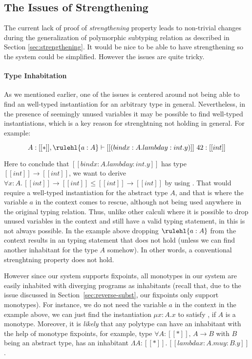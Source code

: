 \subsection{The Issues of Strengthening}
\label{sec:habitability}

The current lack of proof of \emph{strengthening} property leads to non-trivial
changes during the generalization of polymorphic subtyping relation as
described in Section \ref{sec:strengthening}. It would be nice to be able to
have strengthening so the system could be simplified. However the issues are
quite tricky.

\paragraph{Type Inhabitation}
As we mentioned earlier, one of the issues is centered around not being able to find an
well-typed instantiation for an arbitrary type in general. Nevertheless, in the presence of
seemingly unused variables it may be possible to find well-typed instantiations,
which is a key reason for strenghtning not holding in general. For example:

\begin{equation*}
    A : [[*]], \rulehl{a : A} \vdash [[(bind x : A. lambda y : int. y)]]~42 : [[int]]
\end{equation*}

Here to conclude that $[[bind x : A. lambda y : int. y]]$ has type $[[int]] \rightarrow [[int]]$,
we want to derive $\forall x : A.\, [[int]] \rightarrow [[int]] \le [[int]] \rightarrow [[int]]$ by
using . That would require a well-typed instantiation
for the abstract type $A$, and that is where the variable $a$ in the context
comes to rescue, although not being used anywhere in the original typing relation.
Thus, unlike other calculi where it is possible to drop unused variables in the context
and still have a valid typing statement, in \name this is not always possible. In the example
above dropping $\rulehl{a : A}$ from the context results in an typing statement that does not hold
(unless we can find another inhabitant for the type $A$ somehow).
In other words, a conventional strenghtning property does not hold.

However since our system supports fixpoints, all monotypes in our system
are easily inhabited with diverging programs as inhabitants (recall that, due
to the issue discussed in Section~\ref{sec:reverse-subst}, our fixpoints only support monotypes).
For instance, we do not need the variable $a$ in the context in the example above,
we can just find the instantiation $\mu x : A. x$ to satisfy , if $A$ is a
monotype.
Moreover, it is \emph{likely} that any polytype can have an inhabitant with the help
of monotype fixpoints, for example, type $\forall A : [[*]],\, A \rightarrow B$ with $B$
being an abstract type, has an inhabitant $\Lambda A : [[*]].\,[[lambda x : A. mu y : B. y]]$.

